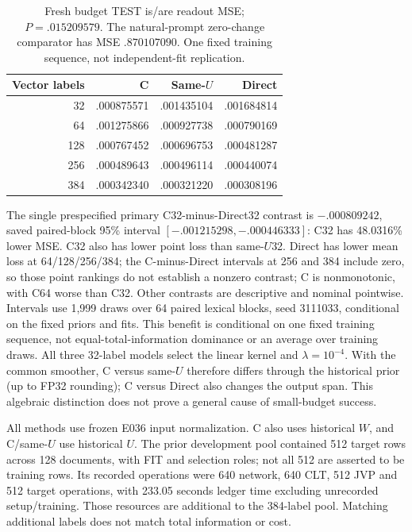 \begin{table}[ht]\centering\small
\begin{tabular}{rrrr}\toprule Vector labels & C & Same-$U$ & Direct\\\midrule
32 & .000875571 & .001435104 & .001684814\\
64 & .001275866 & .000927738 & .000790169\\
128 & .000767452 & .000696753 & .000481287\\
256 & .000489643 & .000496114 & .000440074\\
384 & .000342340 & .000321220 & .000308196\\\bottomrule
\end{tabular}
\caption{Fresh budget TEST is/are readout MSE; $P=.015209579$. The natural-prompt zero-change comparator has MSE $.870107090$. One fixed training sequence, not independent-fit replication.}\label{tab:readbudget}
\end{table}
The single prespecified primary C32-minus-Direct32 contrast is $-.000809242$, saved paired-block 95\% interval $[-.001215298,-.000446333]$: C32 has 48.0316\% lower MSE. C32 also has lower point loss than same-$U$32. Direct has lower mean loss at 64/128/256/384; the C-minus-Direct intervals at 256 and 384 include zero, so those point rankings do not establish a nonzero contrast; C is nonmonotonic, with C64 worse than C32. Other contrasts are descriptive and nominal pointwise. Intervals use 1,999 draws over 64 paired lexical blocks, seed 3111033, conditional on the fixed priors and fits. This benefit is conditional on one fixed training sequence, not equal-total-information dominance or an average over training draws. All three 32-label models select the linear kernel and $\lambda=10^{-4}$. With the common smoother, C versus same-$U$ therefore differs through the historical prior (up to FP32 rounding); C versus Direct also changes the output span. This algebraic distinction does not prove a general cause of small-budget success.

All methods use frozen E036 input normalization. C also uses historical $W$, and C/same-$U$ use historical $U$. The prior development pool contained 512 target rows across 128 documents, with FIT and selection roles; not all 512 are asserted to be training rows. Its recorded operations were 640 network, 640 CLT, 512 JVP and 512 target operations, with 233.05 seconds ledger time excluding unrecorded setup/training. Those resources are additional to the 384-label pool. Matching additional labels does not match total information or cost.

